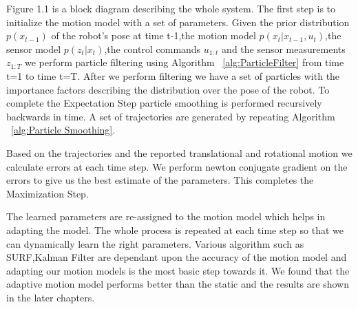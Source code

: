 \documentclass[12pt]{dalcsthesis}
\begin{document}
Figure 1.1 is a block diagram describing the whole system. The
first step is to initialize the motion model with a set of parameters.
Given the prior distribution $p(x_{t-1})$ of the robot's pose at time t-1,the motion model $p(x_{t}|x_{t-1},u_{t})$,the sensor model $p(z_{t}|x_{t})$,the control commands $u_{1:t}$ and the sensor measurements $z_{1:T}$ we perform particle filtering using Algorithm  ~\ref{alg:ParticleFilter} from time t=1 to time t=T. After we perform filtering we have a set of particles with the importance factors  describing the distribution over the pose of the robot.
To complete the Expectation Step particle smoothing is performed recursively backwards in time. A set of trajectories are generated by repeating Algorithm ~\ref{alg:Particle Smoothing}.


Based on the trajectories and the reported translational and rotational 
motion we calculate errors at each time step. We perform newton conjugate
gradient on the errors to give us the best estimate of the parameters.
This completes the Maximization Step.

The learned parameters are re-assigned to the motion model which helps in adapting the model. The  whole
process is repeated at each time step so that we can dynamically learn the right parameters. Various algorithm such as SURF,Kalman Filter are dependant upon the accuracy of the motion model and adapting our motion models is the most basic step towards it. We found that the adaptive motion model performs better than the static and the results are shown in the later chapters.
\end{document}
